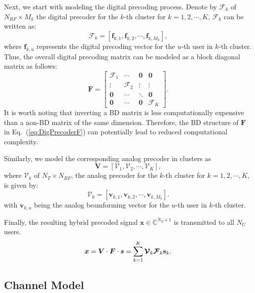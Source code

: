 \documentclass[conference]{IEEEtran}
\begin{document}
{Next, we start with modeling the digital precoding process. Denote by $\bm{\mathcal{F}}_k$ of $N_{RF}\times M_k$ the digital precoder for the $k$-th cluster for $k=1,2,\cdots, K$, $\bm{\mathcal{F}}_k$ can be written as:
\begin{equation}
\bm{\mathcal{F}}_k = \left[\bm{f}_{k,1},\bm{f}_{k,2},\cdots,\bm{f}_{k,M_k}\right],
\end{equation}
where $\bm{f}_{k,u}$ represents the digital precoding vector for the $u$-th user in $k$-th cluster. Thus, the overall digital precoding matrix can be modeled as a block diagonal matrix as follows:
\begin{equation}
\bm{F} =
\begin{bmatrix}
\bm{\mathcal{F}}_1&\cdots & \bm{0}&\bm{0}\\
\vdots & \bm{\mathcal{F}}_2 & \vdots&\vdots \\
\bm{0}&\cdots&\ddots &\bm{0}\\
\bm{0}&\cdots & \bm{0}&\bm{\mathcal{F}}_K
\end{bmatrix}.\label{eq:DigPrecoderF}
\end{equation}
It is worth noting that inverting a BD matrix is less computationally
expensive than a non-BD matrix of the same dimension. Therefore, the BD structure of $\bm{F}$ in Eq.~(\ref{eq:DigPrecoderF}) can potentially lead to reduced computational complexity.

Similarly, we model the corresponding analog precoder in clusters as
\begin{equation}
	\bm{V} = \left[\bm{\mathcal{V}}_1, \bm{\mathcal{V}}_2,\cdots, \bm{\mathcal{V}}_{K}\right], \end{equation}
where $\bm{\mathcal{V}}_k$ of $N_T\times N_{RF}$, the analog precoder for the $k$-th cluster for $k=1,2,\cdots, K$, is given by:
\begin{equation}
\bm{\mathcal{V}}_k = \left[\bm{v}_{k,1},\bm{v}_{k,2},\cdots,\bm{v}_{k,M_k}\right].
\end{equation}
with $\bm{v}_{k,u}$ being the analog beamforming vector for the $u$-th user in $k$-th cluster.

Finally, the resulting hybrid precoded signal $\bm x \in\mathbb{C}^{N_T\times 1}$ is transmitted to all $N_U$ users.
\begin{equation}{\label{eq:transx}}
{\bm x} =  \bm{V}\cdot \bm{F}\cdot\bm{s} =\sum_{k=1}^K \bm{\mathcal{V}}_k \bm{\mathcal{F}}_k \mathbf{s}_k.
\end{equation}


\subsection{Channel Model}

}
\end{document}
